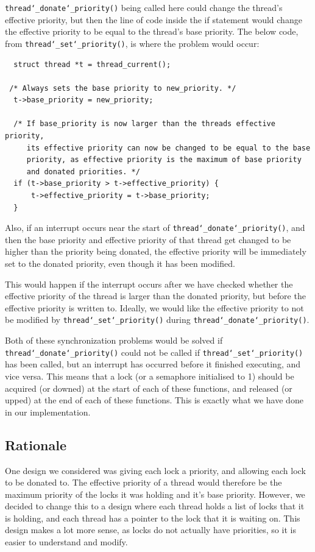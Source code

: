 \documentclass{article}
\renewcommand{\_}{\char`_}
\begin{document}
\texttt{thread\_donate\_priority()} being called here could change the thread's effective priority, but then the line of code inside the if statement would change the effective priority to be equal to the thread's base priority. The below code, from \texttt{thread\_set\_priority()}, is where the problem would occur:

\begin{lstlisting}
  struct thread *t = thread_current();

 /* Always sets the base priority to new_priority. */
  t->base_priority = new_priority;

  /* If base_priority is now larger than the threads effective priority,
     its effective priority can now be changed to be equal to the base
     priority, as effective priority is the maximum of base priority
     and donated priorities. */
  if (t->base_priority > t->effective_priority) {
	  t->effective_priority = t->base_priority;
  }
\end{lstlisting}

Also, if an interrupt occurs near the start of \texttt{thread\_donate\_priority()}, and then the base priority and effective priority of that thread get changed to be higher than the priority being donated, the effective priority will be immediately set to the donated priority, even though it has been modified. 

This would happen if the interrupt occurs after we have checked whether the effective priority of the thread is larger than the donated priority, but before the effective priority is written to. Ideally, we would like the effective priority to not be modified by \texttt{thread\_set\_priority()} during \texttt{thread\_donate\_priority()}.

Both of these synchronization problems would be solved if \texttt{thread\_donate\_priority()} could not be called if \texttt{thread\_set\_priority()} has been called, but an interrupt has occurred before it finished executing, and vice versa. This means that a lock (or a semaphore initialised to 1) should be acquired (or downed) at the start of each of these functions, and released (or upped) at the end of each of these functions. This is exactly what we have done in our implementation.

\subsection{Rationale}

One design we considered was giving each lock a priority, and allowing each lock to be donated to. The effective priority of a thread would therefore be the maximum priority of the locks it was holding and it's base priority. However, we decided to change this to a design where each thread holds a list of locks that it is holding, and each thread has a pointer to the lock that it is waiting on. This design makes a lot more sense, as locks do not actually have priorities, so it is easier to understand and modify.
\end{document}
